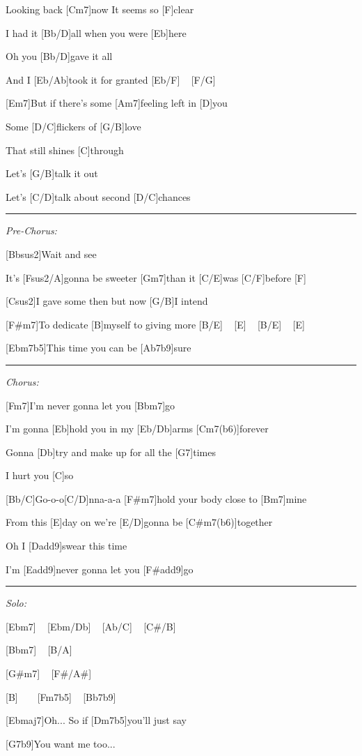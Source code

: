 \documentclass{article}
\begin{document}
\begin{guitar}
[Gm7]Looking back [Cm7]now It seems so [F]clear

I had it [Bb/D]all when you were [Eb]here

Oh you [Bb/D]gave it all

And I [Eb/Ab]took it for granted [Eb/F] ~ [F/G] ~



[Em7]But if there's some [Am7]feeling left in [D]you

Some [D/C]flickers of [G/B]love

That still shines [C]through

Let's [G/B]talk it out

Let's [C/D]talk about second [D/C]chances

\pagebreak
\hrule

\emph{Pre-Chorus:}

[Bbsus2]Wait and see

It's [Fsus2/A]gonna be sweeter [Gm7]than it [C/E]was [C/F]before [F] ~

[Csus2]I gave some then but now [G/B]I intend

[F#m7]To dedicate [B]myself to giving more [B/E] ~ [E] ~ [B/E] ~ [E] ~ 

[Ebm7b5]This time you can be [Ab7b9]sure


\hrule

\emph{Chorus:}

[Fm7]I'm never gonna let you [Bbm7]go

I'm gonna [Eb]hold you in my [Eb/Db]arms [Cm7(b6)]forever

Gonna [Db]try and make up for all the [G7]times

I hurt you [C]so

[Bb/C]Go-o-o[C/D]nna-a-a [F#m7]hold your body close to [Bm7]mine

From this [E]day on we're [E/D]gonna be [C#m7(b6)]together

Oh I [Dadd9]swear this time

I'm [Eadd9]never gonna let you [F#add9]go

\pagebreak
\hrule

\emph{Solo:}

[Ebm7] ~ [Ebm/Db] ~ [Ab/C] ~ [C#/B]

[Bbm7] ~ [B/A]

[G#m7] ~ [F#/A#]

[B] ~ ~ [Fm7b5] ~ [Bb7b9]

[Ebmaj7]Oh... So if [Dm7b5]you'll just say

[G7b9]You want me too...



\end{guitar}
\end{document}
